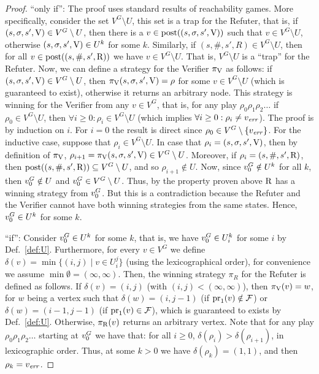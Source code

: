 \begin{proof} 
	``only if'': The proof uses standard results of reachability games. More specifically, consider the set $V^G \setminus U$, this set is
a trap for the Refuter, that is, if $(s,\sigma, s', \mathrm{V}) \in V^G \setminus U$, then there is a $v \in \operatorname{post}((s,\sigma, s', \mathrm{V}))$ such 
that $v \in V^G \setminus U$, otherwise
$(s,\sigma, s', \mathrm{V}) \in U^k$ for some $k$. Similarly, if $(s,\#, s', R) \in V^G \setminus U$, then for all $v \in \operatorname{post}((s,\#, s', \mathrm{R}))$ 
we have $v \in V^G \setminus U$. That is, $V^G \setminus U$ is a ``trap'' for the Refuter. 
Now, we can define a strategy for the Verifier $\pi_{\mathrm{V}}$ as follows: if $(s, \sigma, s', \mathrm{V}) \in V^G \setminus U$, then
$\pi_{\mathrm{V}}(s, \sigma, s', \mathrm{V}) = \rho$ for some $v \in V^G \setminus U$ (which is guaranteed to exist), otherwise it returns an arbitrary node. 
This strategy is winning for the Verifier from any $v \in V^G$, that is, for any play $\rho_0 \rho_1 \rho_2 \dots$ 
if $\rho_0 \in V^G \setminus U$, then $\forall i \geq 0: \rho_i \in V^G \setminus U$ 
(which implies $\forall i \geq 0: \rho_i \neq v_{\mathit{err}}$). 
The proof is by induction on $i$. For $i=0$ the result is direct since $\rho_0 \in V^G \setminus \{v_{\mathit{err}}\}$. For the inductive case,
suppose that $\rho_i \in V^G \setminus U$. In case that $\rho_i = (s, \sigma, s', \mathrm{V})$, then by definition of $\pi_{\mathrm{V}}$, 
$\rho_{i+1} = \pi_{\mathrm{V}}(s,\sigma, s', \mathrm{V}) \in V^G \setminus U$.
Moreover, if $\rho_i = (s, \#, s', \mathrm{R})$, then $\operatorname{post}((s, \#, s', \mathrm{R})) \subseteq V^G \setminus U$, 
and so $\rho_{i+1} \notin U$. 
Now, since $v_0^G \notin U^k$ for all $k$, then $v_0^G \notin U$ and $v_0^G \in V^G \setminus U$. 
Thus, by the property proven above $\mathrm{R}$ has a winning strategy from 
$v_0^G$. But this is a contradiction because the Refuter and the Verifier cannot have both winning strategies from the same states. 
Hence, $v_0^G \in U^k$ for some $k$.
	
``if'': Consider $v_0^G \in U^k$ for some $k$, that is, we have  $v_0^G \in U^k_i$ for some $i$ by Def.~\ref{def:U}. 
Furthermore, for every $v \in V^G$ we define $\delta(v) = \min \{ (i,j) \mid v \in U^j_i \}$ (using the lexicographical order), for convenience we assume $\min \emptyset = (\infty, \infty)$.
Then, the winning strategy $\pi_R$ for the Refuter is defined as follows. If $\delta(v) = (i,j)$ (with $(i,j) < (\infty, \infty)$), then $\pi_{\mathrm{V}}(v) = w$, for $w$ being a vertex such that
$\delta(w) = (i,j-1)$ (if $\operatorname{pr}_{1}(v) \notin \mathcal{F}$) or $\delta(w) = (i-1,j-1)$ (if $\operatorname{pr}_{1}(v) \in \mathcal{F}$), which is guaranteed to exists by Def.~\ref{def:U}. Otherwise, $\pi_{\mathrm{R}}(v)$ returns
an arbitrary vertex. Note that for any play $\rho_0 \rho_1 \rho_2 \dots$ starting at $v_0^G$ we have that:  for all $i \geq 0$, $\delta(\rho_i) > \delta(\rho_{i+1})$, in lexicographic order.
	Thus, at some $k>0$ we have $\delta(\rho_k) = (1,1)$, and then $\rho_k = v_{\mathit{err}}$.
\qedhere
\end{proof} \\

